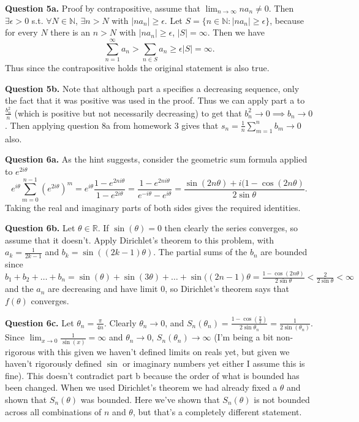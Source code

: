 \documentclass[letterpaper, reqno,11pt]{article}
\begin{document}
\newpage\phantom{blabla}
\newpage

{\medskip\noindent\bf Question 5a.} Proof by contrapositive, assume that $\lim_{n\to\infty}na_n\neq 0$. Then $\exists \epsilon>0$ s.t. $\forall N\in \mathbb{N}$, $\exists n>N$ with $|na_n|\geq\epsilon$. Let $S=\{n\in \mathbb{N}: |na_n|\geq\epsilon\}$, because for every $N$ there is an $n>N$ with $|na_n|\geq\epsilon$, $|S|=\infty$. Then we have
\[
\sum_{n=1}^{\infty}a_n>\sum_{n\in S}a_n\geq \epsilon|S|=\infty
.\]
Thus since the contrapositive holds the original statement is also true.

{\medskip\noindent\bf Question 5b.} Note that although part a specifies a decreasing sequence, only the fact that it was positive was used in the proof. Thus we can apply part a to $\frac{b_n^2}{n}$ (which is positive but not necessarily decreasing) to get that $b_n^2\to 0\implies b_n\to 0$. Then applying question 8a from homework 3 gives that $s_n=\frac{1}{n}\sum_{m=1}^{n}b_m\to 0$ also.

\newpage\phantom{blabla}
\newpage

{\medskip\noindent\bf Question 6a.} As the hint suggests, consider the geometric sum formula applied to $e^{2i\theta}$
\[
e^{i\theta}\sum_{m=0}^{n-1}\left(e^{2i\theta}\right)^{m}=e^{i\theta}\frac{1-e^{2ni\theta}}{1-e^{2i\theta}}=\frac{1-e^{2ni\theta}}{e^{-i\theta}-e^{i\theta}}=\frac{\sin(2n\theta)+i(1-\cos(2n\theta)}{2\sin\theta}
.\]
Taking the real and imaginary parts of both sides gives the required identities.

{\medskip\noindent\bf Question 6b.} Let $\theta\in \mathbb{R}$. If $\sin(\theta)=0$ then clearly the series converges, so assume that it doesn't. Apply Dirichlet's theorem to this problem, with $a_k=\frac{1}{2k-1}$ and $b_k=\sin((2k-1)\theta)$. The partial sums of the $b_n$ are bounded since $b_1+b_2+\ldots+b_n=\sin(\theta)+\sin(3\theta)+\ldots+\sin((2n-1)\theta=\frac{1-\cos(2n\theta)}{2\sin\theta}<\frac{2}{2\sin\theta}<\infty$ and the $a_n$ are decreasing and have limit $0$, so Dirichlet's theorem says that $f(\theta)$ converges.

{\medskip\noindent\bf Question 6c.} Let $\theta_n=\frac{\pi}{4n}$. Clearly $\theta_n\to 0$, and $S_n(\theta_n)=\frac{1-\cos(\frac{\pi}{2})}{2\sin\theta_n}=\frac{1}{2\sin(\theta_n)}$. Since $\lim_{x\to0}\frac{1}{\sin(x)}=\infty$ and $\theta_n\to 0$, $S_n(\theta_n)\to \infty$ (I'm being a bit non-rigorous with this given we haven't defined limits on reals yet, but given we haven't rigorously defined $\sin$ or imaginary numbers yet either I assume this is fine). This doesn't contradict part b because the order of what is bounded has been changed. When we used Dirichlet's theorem we had already fixed a $\theta$ and shown that $S_n(\theta)$ was bounded. Here we've shown that $S_n(\theta)$ is not bounded across all combinations of $n$ and $\theta$, but that's a completely different statement.
\end{document}
